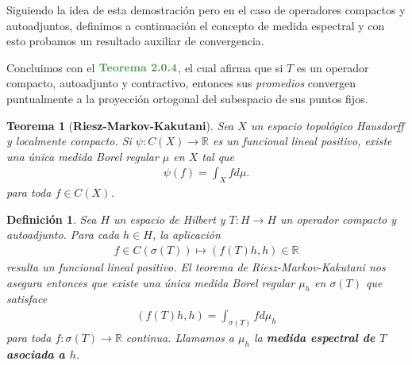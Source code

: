 \documentclass[11pt]{report}
\theoremstyle{colored}
\newtheorem{definition}{Definición}[section]
\newtheorem*{theorem*}{Teorema}
\newcommand{\R}{\mathbb{R}}
\newcommand{\ip}[1]{( #1 )}
\newcommand{\paint}[1]{\color{color}{#1}}
\newcommand{\tpaint}[1]{\paint{\textbf{#1}}}
\begin{document}
Siguiendo la idea de esta demostración pero en el caso de operadores compactos y autoadjuntos, definimos a continuación el concepto de medida espectral y con esto probamos un resultado auxiliar de convergencia. 

Concluimos con el $\tpaint{Teorema 2.0.4}$, el cual afirma que si $T$ es un operador compacto, autoadjunto y contractivo, entonces sus \textit{promedios} convergen puntualmente a la proyección ortogonal del subespacio de sus puntos fijos.
\\
\begin{tcolorbox}
\begin{theorem*}[\textbf{Riesz-Markov-Kakutani}] Sea $X$ un espacio topológico Hausdorff y localmente compacto. Si $\psi : C(X) \to \R$ es un funcional lineal positivo, existe una única medida Borel regular $\mu$ en $X$ tal que
\begin{align*}
\psi(f) = \int_X f d\mu.
\end{align*}
para toda $f \in C(X)$.
\end{theorem*}
\end{tcolorbox}

\begin{definition} Sea $H$ un espacio de Hilbert y $T : H \to H$ un operador compacto y autoadjunto. Para cada $h \in H$, la aplicación 
\begin{align*}
f \in C(\sigma(T)) \mapsto \ip{f(T)h,h} \in \R
\end{align*}
resulta un funcional lineal positivo. El teorema de Riesz-Markov-Kakutani nos asegura entonces que existe una única medida Borel regular $\mu_h$ en $\sigma(T)$ que satisface
\begin{align*}
\ip{f(T)h,h} = \int_{\sigma(T)} f d\mu_h
\end{align*}
para toda $f : \sigma(T) \to \R$ continua. Llamamos a $\mu_h$ la \textbf{medida espectral de $T$ asociada a $h$}.
\end{definition}
\end{document}
